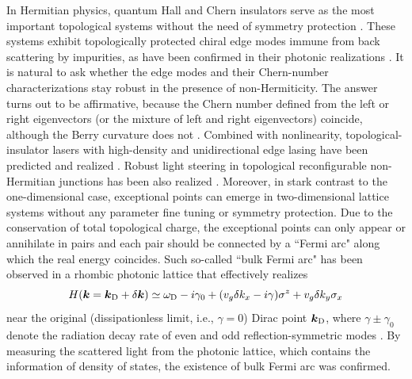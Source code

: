 \documentclass{tADP2e}
\theoremstyle{plain}
\theoremstyle{plain}
\theoremstyle{definition}
\begin{document}
In Hermitian physics, quantum Hall and Chern insulators serve as the most important topological systems without the need of symmetry protection \cite{SAP08}. These systems exhibit topologically protected chiral edge modes immune from back scattering by impurities, as have been confirmed in their photonic realizations \cite{WZ08,WZ09}. It is natural to ask whether the edge modes and their Chern-number characterizations stay robust in the presence of non-Hermiticity. The answer turns out to be affirmative, because the Chern number defined from the left or right eigenvectors (or the mixture of left and right eigenvectors) coincide, although the Berry curvature does not \cite{SH18}. Combined with nonlinearity, topological-insulator lasers with high-density and unidirectional edge lasing have been predicted and realized \cite{HG18,BM18}. Robust light steering in topological reconfigurable non-Hermitian junctions has been also realized \cite{ZH192}.  Moreover, in stark contrast to the one-dimensional case, exceptional points can emerge in two-dimensional lattice systems without any parameter fine tuning or symmetry protection. Due to the conservation of total topological charge, the exceptional points can only appear or annihilate in pairs and each pair should be connected by a ``Fermi arc" along which the real energy coincides. Such so-called ``bulk Fermi arc" has been observed in a rhombic photonic lattice that effectively realizes 
\begin{equation}
H(\boldsymbol{k}=\boldsymbol{k}_{\rm D}+\delta\boldsymbol{k})\simeq \omega_{\rm D}-i\gamma_0+(v_g\delta k_x-i\gamma)\sigma^z+v_g\delta k_y\sigma_x
\label{BFA}
\end{equation}
near the original (dissipationless limit, i.e., $\gamma=0$) Dirac point $\boldsymbol{k}_{\rm D}$, where $\gamma\pm\gamma_0$ denote the radiation decay rate of even and odd %
reflection-symmetric modes \cite{ZH18}. By measuring the scattered light from the photonic lattice, which contains the information of density of states, the existence of bulk Fermi arc was confirmed.
\end{document}
